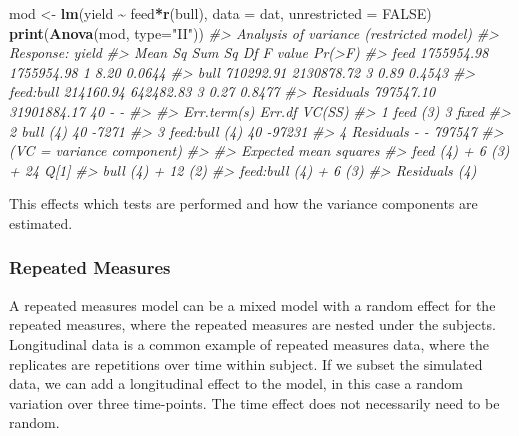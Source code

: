 \documentclass[
]{article}
\newenvironment{Shaded}{\begin{snugshade}}{\end{snugshade}}
\newcommand{\AttributeTok}[1]{\textcolor[rgb]{0.13,0.29,0.53}{#1}}
\newcommand{\CommentTok}[1]{\textcolor[rgb]{0.56,0.35,0.01}{\textit{#1}}}
\newcommand{\ConstantTok}[1]{\textcolor[rgb]{0.56,0.35,0.01}{#1}}
\newcommand{\FunctionTok}[1]{\textcolor[rgb]{0.13,0.29,0.53}{\textbf{#1}}}
\newcommand{\NormalTok}[1]{#1}
\newcommand{\OtherTok}[1]{\textcolor[rgb]{0.56,0.35,0.01}{#1}}
\newcommand{\SpecialCharTok}[1]{\textcolor[rgb]{0.81,0.36,0.00}{\textbf{#1}}}
\newcommand{\StringTok}[1]{\textcolor[rgb]{0.31,0.60,0.02}{#1}}
\begin{document}
\begin{Shaded}
\begin{Highlighting}[]
\NormalTok{mod }\OtherTok{\textless{}{-}} \FunctionTok{lm}\NormalTok{(yield }\SpecialCharTok{\textasciitilde{}}\NormalTok{ feed}\SpecialCharTok{*}\FunctionTok{r}\NormalTok{(bull), }\AttributeTok{data =}\NormalTok{ dat, }\AttributeTok{unrestricted =} \ConstantTok{FALSE}\NormalTok{)}
\FunctionTok{print}\NormalTok{(}\FunctionTok{Anova}\NormalTok{(mod, }\AttributeTok{type=}\StringTok{"II"}\NormalTok{))}
\CommentTok{\#\textgreater{} Analysis of variance (restricted model)}
\CommentTok{\#\textgreater{} Response: yield}
\CommentTok{\#\textgreater{}              Mean Sq      Sum Sq Df F value Pr(\textgreater{}F)}
\CommentTok{\#\textgreater{} feed      1755954.98  1755954.98  1    8.20 0.0644}
\CommentTok{\#\textgreater{} bull       710292.91  2130878.72  3    0.89 0.4543}
\CommentTok{\#\textgreater{} feed:bull  214160.94   642482.83  3    0.27 0.8477}
\CommentTok{\#\textgreater{} Residuals  797547.10 31901884.17 40       {-}      {-}}
\CommentTok{\#\textgreater{} }
\CommentTok{\#\textgreater{}             Err.term(s) Err.df VC(SS)}
\CommentTok{\#\textgreater{} 1 feed              (3)      3  fixed}
\CommentTok{\#\textgreater{} 2 bull              (4)     40  {-}7271}
\CommentTok{\#\textgreater{} 3 feed:bull         (4)     40 {-}97231}
\CommentTok{\#\textgreater{} 4 Residuals           {-}      {-} 797547}
\CommentTok{\#\textgreater{} (VC = variance component)}
\CommentTok{\#\textgreater{} }
\CommentTok{\#\textgreater{}           Expected mean squares}
\CommentTok{\#\textgreater{} feed      (4) + 6 (3) + 24 Q[1]}
\CommentTok{\#\textgreater{} bull      (4) + 12 (2)         }
\CommentTok{\#\textgreater{} feed:bull (4) + 6 (3)          }
\CommentTok{\#\textgreater{} Residuals (4)}
\end{Highlighting}
\end{Shaded}

This effects which tests are performed and how the variance components
are estimated.

\subsubsection{Repeated Measures}\label{repeated-measures}

A repeated measures model can be a mixed model with a random effect for
the repeated measures, where the repeated measures are nested under the
subjects. Longitudinal data is a common example of repeated measures
data, where the replicates are repetitions over time within subject. If
we subset the simulated data, we can add a longitudinal effect to the
model, in this case a random variation over three time-points. The time
effect does not necessarily need to be random.
\end{document}
